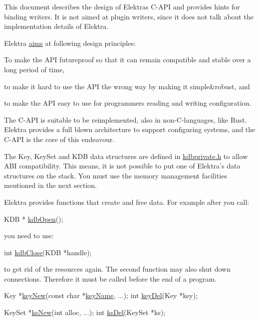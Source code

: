 This document describes the design of Elektra\textquotesingle{}s C-\/\+A\+PI and provides hints for binding writers. It is not aimed at plugin writers, since it does not talk about the implementation details of Elektra.

Elektra \hyperlink{doc_GOALS_md}{aims} at following design principles\+:


\begin{DoxyEnumerate}
\item To make the A\+PI futureproof so that it can remain compatible and stable over a long period of time,
\item to make it hard to use the A\+PI the wrong way by making it simple\&robust, and
\item to make the A\+PI easy to use for programmers reading and writing configuration.
\end{DoxyEnumerate}

The C-\/\+A\+PI is suitable to be reimplemented, also in non-\/\+C-\/languages, like Rust. Elektra provides a full blown architecture to support configuring systems, and the C-\/\+A\+PI is the core of this endeavour.

The {\ttfamily Key}, {\ttfamily Key\+Set} and {\ttfamily K\+DB} data structures are defined in {\ttfamily \hyperlink{kdbprivate_8h}{kdbprivate.\+h}} to allow A\+BI compatibility. This means, it is not possible to put one of Elektra’s data structures on the stack. You must use the memory management facilities mentioned in the next section.

Elektra provides functions that create and free data. For example after you call\+:


\begin{DoxyCode}
KDB * \hyperlink{group__kdb_ga844e1299a84c3fbf1d3a905c5c893ba5}{kdbOpen}();
\end{DoxyCode}


you need to use\+:


\begin{DoxyCode}
\textcolor{keywordtype}{int} \hyperlink{group__kdb_gadb54dc9fda17ee07deb9444df745c96f}{kdbClose}(KDB *handle);
\end{DoxyCode}


to get rid of the resources again. The second function may also shut down connections. Therefore it must be called before the end of a program.


\begin{DoxyCode}
Key *\hyperlink{group__key_gad23c65b44bf48d773759e1f9a4d43b89}{keyNew}(\textcolor{keyword}{const} \textcolor{keywordtype}{char} *\hyperlink{group__keyname_ga8e805c726a60da921d3736cda7813513}{keyName}, ...);
\textcolor{keywordtype}{int} \hyperlink{group__key_ga3df95bbc2494e3e6703ece5639be5bb1}{keyDel}(Key *key);

KeySet *\hyperlink{group__keyset_ga671e1aaee3ae9dc13b4834a4ddbd2c3c}{ksNew}(\textcolor{keywordtype}{int} alloc, ...);
\textcolor{keywordtype}{int} \hyperlink{group__keyset_ga27e5c16473b02a422238c8d970db7ac8}{ksDel}(KeySet *ks);
\end{DoxyCode}


